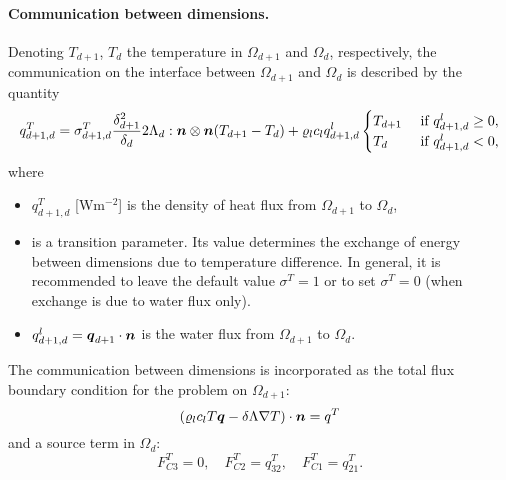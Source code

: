 \paragraph{Communication between dimensions.}
Denoting $T_{d+1}$, $T_d$ the temperature in $\Omega_{d+1}$ and $\Omega_d$, respectively, the communication on the interface between $\Omega_{d+1}$ and $\Omega_d$ is described by the quantity
\begin{equation}
  \label{e:inter_dim_flux_heat}
  q^T_{d+1,d} = \sigma^T_{d+1,d} \frac{\delta_{d+1}^2}{\delta_d}2\Lambda_d:\n\otimes\n ( T_{d+1} - T_d) + \varrho_l c_l q^l_{d+1,d}\begin{cases} T_{d+1} & \mbox{ if }q^l_{d+1,d}\ge 0,\\ T_d & \mbox{ if } q^l_{d+1,d}<0,\end{cases}
\end{equation}
where
\begin{itemize}
\item $q^T_{d+1,d}$ [W$\mathrm{m}^{-2}$] is the density of heat flux from $\Omega_{d+1}$ to $\Omega_d$,
\item {} \units{}{}{} is a transition parameter.
Its value determines the exchange of energy between dimensions due to temperature difference.
In general, it is recommended to leave the default value $\sigma^T=1$ or to set $\sigma^T=0$ (when exchange is due to water flux only).
\item $q^l_{d+1,d}=\mathbf{\boldsymbol{q}}_{d+1}\cdot\mathbf{\boldsymbol{n}}$ is the water flux from $\Omega_{d+1}$ to $\Omega_d$.
\end{itemize}
The communication between dimensions is incorporated as the total flux boundary condition for the problem on $\Omega_{d+1}$:
\begin{equation}
\label{e:heat_FC}
\left(\varrho_l c_l T \vc q - \delta\Lambda\nabla T\right)\cdot\vc n = q^T
\end{equation}
and a source term in $\Omega_d$:
\begin{equation}
F^T_{C3} = 0,\quad
F^T_{C2} = q^T_{32},\quad
F^T_{C1} = q^T_{21}.
\end{equation}




